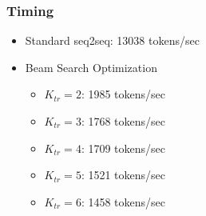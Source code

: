 \begin{frame}
  \frametitle{Timing}
  \begin{itemize}
  \item Standard seq2seq: 13038 tokens/sec
  \item Beam Search Optimization
    \begin{itemize}
    \item $K_{tr} = 2$: 1985 tokens/sec
    \item $K_{tr} = 3$: 1768 tokens/sec
    \item $K_{tr} = 4$: 1709 tokens/sec
    \item $K_{tr} = 5$: 1521 tokens/sec
    \item $K_{tr} = 6$: 1458 tokens/sec
    \end{itemize}
  \end{itemize}
\end{frame}
